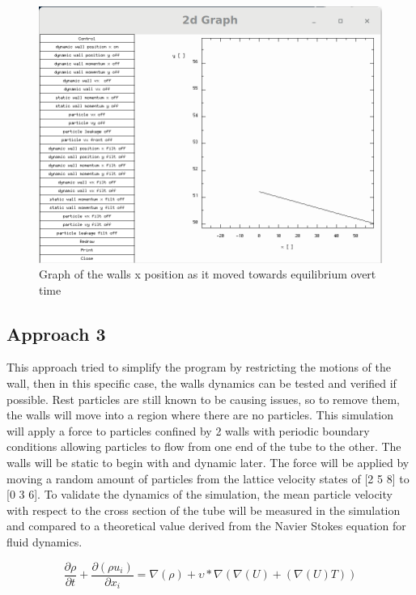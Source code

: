 \documentclass{article}
\begin{document}
\begin{figure}[H]
\includegraphics[scale=0.35]{A11p4.png}
\caption{\label{fig} Graph of the walls x position as it moved towards equilibrium overt time}
\end{figure}


\subsection{Approach 3}

This approach tried to simplify the program by restricting the motions of the wall, then in this specific case, the walls dynamics can be tested and verified if possible. Rest particles are still known to be causing issues, so to remove them, the walls will move into a region where there are no particles. This simulation will apply a force to particles confined by 2 walls with periodic boundary conditions allowing particles to flow from one end of the tube to the other. The walls will be static to begin with and dynamic later. The force will be applied by moving a random amount of particles from the lattice velocity states of [2 5 8] to [0 3 6]. To validate the dynamics of the simulation, the mean particle velocity with respect to the cross section of the tube will be measured in the simulation and compared to a theoretical value derived from the Navier Stokes equation for fluid dynamics.

\begin{equation}
\frac{\partial \rho}{\partial t} + \frac{\partial(\rho u_{i})}{\partial x_{i}} = \nabla(\rho) + \upsilon *\nabla(\nabla(U)+(\nabla(U)T))
\end{equation}
\end{document}
